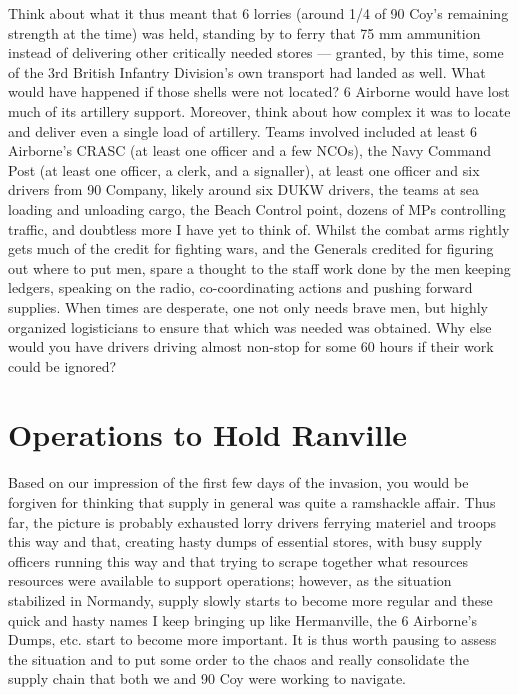 \documentclass[noraggedright]{turabian-researchpaper}
\begin{document}
Think about what it thus meant that 6 lorries (around 1/4 of 90 Coy's remaining
strength at the time) was held, standing by to ferry that 75 mm ammunition 
instead of delivering other critically needed stores --- granted, by this time,
some of
the 3rd British Infantry Division's own transport had landed as well.  What
would have happened if those shells were not located?  6 Airborne would have
lost much of its artillery support.  Moreover, think about how complex it was
to locate and deliver even a single load of artillery.  Teams involved included
at least 6 Airborne's CRASC (at least one officer and a few NCOs), the Navy
Command Post (at least one officer, a clerk, and a signaller), at least one
officer and six drivers from 90 Company, likely around six DUKW drivers, the
teams at sea loading and unloading cargo, the Beach Control point, dozens of 
MPs controlling traffic, and doubtless more I have yet to think of.  Whilst 
the combat arms rightly gets much of the credit for fighting wars, and the
Generals credited for figuring out where to put men, spare a thought to the
staff work done by the men keeping ledgers, speaking on the radio, 
co-coordinating actions and pushing forward supplies.  When times are desperate, 
one not only needs brave men, but highly organized logisticians to ensure
that which was needed was obtained. Why else would you have drivers driving
almost non-stop for some 60 hours if their work could be ignored?



\section{Operations to Hold Ranville} %

Based on our impression of the first few days of the invasion, you would be 
forgiven for thinking that supply in general was quite a ramshackle affair.
Thus far, the picture is probably exhausted lorry drivers ferrying materiel and
troops this way and that, creating hasty dumps of essential stores, with busy
supply officers running this way and that trying to scrape together what 
resources resources were available to support operations; however, as the
situation stabilized in Normandy, supply slowly starts to become more regular
and these quick and hasty names I keep bringing up like Hermanville, the
6 Airborne's Dumps, etc. start to become more important.  It is thus
worth pausing to assess the situation and to put some order to the chaos and
really consolidate the supply chain that both we and 90 Coy were working to 
navigate. 
\end{document}
